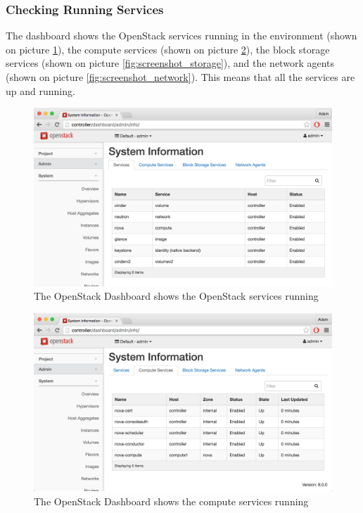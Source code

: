\subsubsection{Checking Running Services}

The dashboard shows the OpenStack services running in the environment (shown on picture \ref{fig:screenshot_services}), the compute services (shown on picture \ref{fig:screenshot_compute}), the block storage services (shown on picture \ref{fig:screenshot_storage}), and the network agents (shown on picture \ref{fig:screenshot_network}). This means that all the services are up and running.


\begin{figure}[!h]
  \includegraphics[width=\textwidth]{fig/screenshot_services.png}
  \caption{The OpenStack Dashboard shows the OpenStack services running}
  \label{fig:screenshot_services}
\end{figure}


\begin{figure}[!h]
  \includegraphics[width=\textwidth]{fig/screenshot_compute.png}
  \caption{The OpenStack Dashboard shows the compute services running}
  \label{fig:screenshot_compute}
\end{figure}


